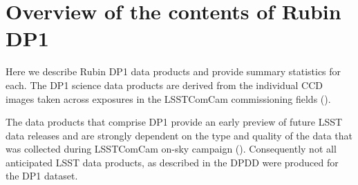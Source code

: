 \section{Overview of the contents of Rubin DP1
\label{sec:data_products}}

Here we describe Rubin DP1 data products and provide summary statistics for each. 
The DP1 science data products are derived from the \nvisitimages individual CCD images taken across \nexposures exposures in the \nfields LSSTComCam commissioning fields ().

The data products that comprise DP1 provide an early preview of future LSST data releases and are strongly dependent on the type and quality of the data that was collected during LSSTComCam on-sky campaign (). 
Consequently not all anticipated  LSST data products, as described in the DPDD \citep{LSE-163} were produced for the DP1 dataset.

